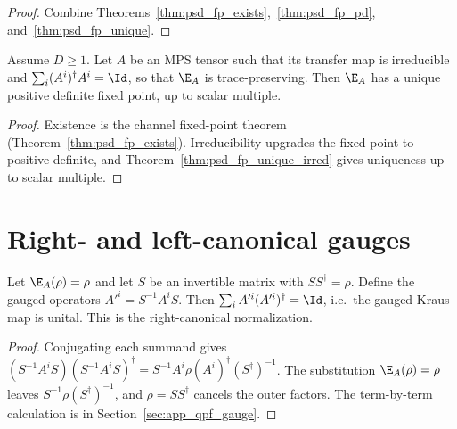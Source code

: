 \begin{proof}
    \leanok
    Combine Theorems~\ref{thm:psd_fp_exists},~\ref{thm:psd_fp_pd},
    and~\ref{thm:psd_fp_unique}.
\end{proof}

\begin{theorem}
    \label{thm:qpf_irreducible}
    \leanok
    Assume $D\ge 1$. Let $A$ be an MPS tensor such that its transfer map is
    irreducible and $\sum_i (A^i)^\dagger A^i=\Id$, so that $\E_A$ is
    trace-preserving.
    Then $\E_A$ has a unique positive definite fixed point, up to scalar
    multiple.
\end{theorem}

\begin{proof}\leanok
    Existence is the channel fixed-point theorem
    (Theorem~\ref{thm:psd_fp_exists}). Irreducibility upgrades the fixed point
    to positive definite, and Theorem~\ref{thm:psd_fp_unique_irred} gives
    uniqueness up to scalar multiple.
\end{proof}

\section{Right- and left-canonical gauges}

\begin{theorem}\label{thm:right_canonical_gauge}
    \leanok
    Let $\E_A(\rho) = \rho$ and let $S$ be an invertible matrix with
    $SS^\dagger = \rho$.
    Define the gauged operators $A'^i = S^{-1}A^iS$.
    Then $\sum_i A'^i(A'^i)^\dagger = \Id$, i.e.\ the gauged
    Kraus map is unital. This is the right-canonical normalization.
\end{theorem}

\begin{proof}\leanok
    Conjugating each summand gives
    $(S^{-1}A^iS)(S^{-1}A^iS)^\dagger
        =S^{-1}A^i\rho(A^i)^\dagger(S^\dagger)^{-1}$.
    The substitution $\E_A(\rho)=\rho$ leaves
    $S^{-1}\rho(S^\dagger)^{-1}$, and $\rho=SS^\dagger$ cancels the
    outer factors. The term-by-term calculation is in
    Section~\ref{sec:app_qpf_gauge}.
\end{proof}

